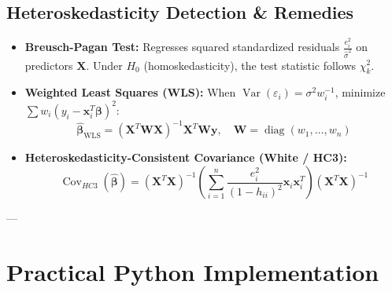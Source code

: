 \documentclass[
]{article}
\begin{document}
\textbf{ }

\subsection{Heteroskedasticity Detection \& Remedies}

\begin{itemize}
\item
  \textbf{Breusch-Pagan Test:} Regresses squared standardized residuals
  \(\frac{e_{i}^{2}}{{\hat{\sigma}}^{2}}\) on predictors \(\mathbf{X}\).
  Under \(H_{0}\) (homoskedasticity), the test statistic follows
  \(\chi_{k}^{2}\).
\item
  \textbf{Weighted Least Squares (WLS):} When
  \(\operatorname{Var}(\varepsilon_{i}) = \sigma^{2}w_{i}^{- 1}\),
  minimize
  \(\sum w_{i}\left( y_{i} - \mathbf{x}_{i}^{T}\mathbf{\beta} \right)^{2}\):
  \[{\hat{\mathbf{\beta}}}_{\text{WLS}} = \left( \mathbf{X}^{T}\mathbf{W}\mathbf{X} \right)^{- 1}\mathbf{X}^{T}\mathbf{W}\mathbf{y},\quad\mathbf{W} = \operatorname{diag}(w_{1},\ldots,w_{n})\]
\item
  \textbf{Heteroskedasticity-Consistent Covariance (White / HC3):}
  \[\operatorname{Cov}_{HC3}\left( \hat{\mathbf{\beta}} \right) = \left( \mathbf{X}^{T}\mathbf{X} \right)^{- 1}\left( \sum_{i = 1}^{n}\frac{e_{i}^{2}}{\left( 1 - h_{ii} \right)^{2}}\mathbf{x}_{i}\mathbf{x}_{i}^{T} \right)\left( \mathbf{X}^{T}\mathbf{X} \right)^{- 1}\]
\end{itemize}

---

\textbf{ }

\section{Practical Python Implementation}
\end{document}
